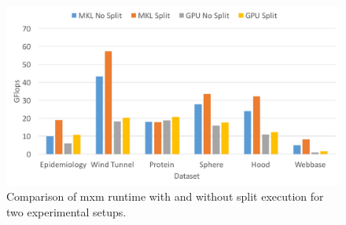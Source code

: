 \begin{figure}
	\centering
	\includegraphics[width=.9\linewidth]{gflops.pdf}
	\caption{Comparison of {\sf mxm} runtime with and without split execution for two experimental setups.}
	\label{fig:gflops}
\end{figure}
